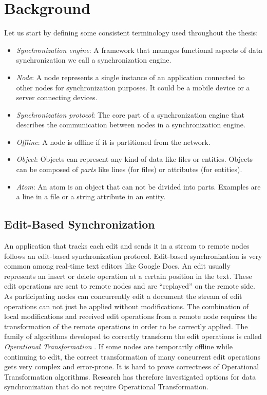 
\chapter{Background}\label{background}

Let us start by defining some consistent terminology used throughout the thesis:

\begin{itemize}
\item \emph{Synchronization engine}: A framework that manages functional aspects of data synchronization we call a synchronization engine.
\item \emph{Node}: A node represents a single instance of an application connected to other nodes for synchronization purposes. It could be a mobile device or a server connecting devices.
\item \emph{Synchronization protocol}: The core part of a synchronization engine that describes the communication between nodes in a synchronization engine.
\item \emph{Offline}: A node is offline if it is partitioned from the network.
\item \emph{Object}: Objects can represent any kind of data like files or entities. Objects can be composed of \emph{parts} like lines (for files) or attributes (for entities).
\item \emph{Atom}: An atom is an object that can not be divided into parts. Examples are a line in a file or a string attribute in an entity.
\end{itemize}

\section{Edit-Based Synchronization}
An application that tracks each edit and sends it in a stream to remote nodes follows an edit-based synchronization protocol.
Edit-based synchronization is very common among real-time text editors like Google Docs.
An edit usually represents an insert or delete operation at a certain position in the text.
These edit operations are sent to remote nodes and are ``replayed'' on the remote side.
As participating nodes can concurrently edit a document the stream of edit operations can not just be applied without modifications.
The combination of local modifications and received edit operations from a remote node requires the transformation of the remote operations in order to be correctly applied.
The family of algorithms developed to correctly transform the edit operations is called \emph{Operational Transformation} \cite{Ellis:1998vf}.
If some nodes are temporarily offline while continuing to edit, the correct transformation of many concurrent edit operations gets very complex and error-prone.
It is hard to prove correctness of Operational Transformation algorithms.
Research has therefore investigated options for data synchronization that do not require Operational Transformation.\\

